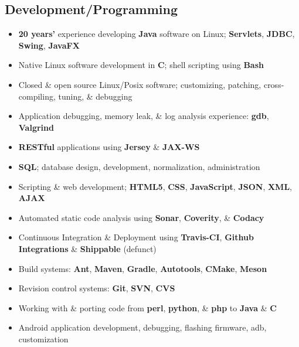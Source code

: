 \documentclass[10pt]{report}
\begin{document}
\subsection*{Development/Programming}
\begin{itemize}
  \item \textbf{20 years’} experience developing \textbf{Java} software on Linux; \textbf{Servlets}, \textbf{JDBC}, \textbf{Swing}, \textbf{JavaFX}
  \item Native Linux software development in \textbf{C}; shell scripting using \textbf{Bash}
  \item Closed \& open source Linux/Posix software; customizing, patching, cross-compiling, tuning, \& debugging
  \item Application debugging, memory leak, \& log analysis experience: \textbf{gdb}, \textbf{Valgrind}
  \item \textbf{RESTful} applications using \textbf{Jersey} \& \textbf{JAX-WS}
  \item \textbf{SQL}; database design, development, normalization, administration
  \item Scripting \& web development; \textbf{HTML5}, \textbf{CSS}, \textbf{JavaScript}, \textbf{JSON}, \textbf{XML}, \textbf{AJAX}
  \item Automated static code analysis using \textbf{Sonar}, \textbf{Coverity}, \& \textbf{Codacy}
  \item Continuous Integration \& Deployment using \textbf{Travis-CI}, \textbf{Github Integrations} \& \textbf{Shippable} (defunct)
  \item Build systems: \textbf{Ant}, \textbf{Maven}, \textbf{Gradle}, \textbf{Autotools}, \textbf{CMake}, \textbf{Meson}
  \item Revision control systems: \textbf{Git}, \textbf{SVN}, \textbf{CVS}
  \item Working with \& porting code from \textbf{perl}, \textbf{python}, \& \textbf{php} to \textbf{Java} \& \textbf{C}
  \item Android application development, debugging, flashing firmware, adb, customization
\end{itemize}
\vspace{-1em}
\end{document}
